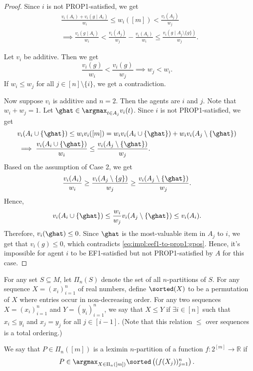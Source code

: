 \begin{proof}
Since $i$ is not PROP1-satisfied, we get
\begin{align*}
& \frac{v_i(A_i) + v_i(g \mid A_i)}{w_i} \le w_i([m]) < \frac{v_i(A_j)}{w_j}
\\ &\implies \frac{v_i(g \mid A_i)}{w_i} < \frac{v_i(A_j)}{w_j} - \frac{v_i(A_i)}{w_i}
    \le \frac{v_i(g \mid A_j \setminus \{g\})}{w_j}.
\end{align*}

Let $v_i$ be additive. Then we get
\[ \frac{v_i(g)}{w_i} < \frac{v_i(g)}{w_j} \implies w_j < w_i. \]
If $w_i \le w_j$ for all $j \in [n] \setminus \{i\}$, we get a contradiction.

Now suppose $v_i$ is additive and $n=2$.
Then the agents are $i$ and $j$. Note that $w_i + w_j = 1$.
Let $\ghat \in \argmax_{t \in A_j} v_i(t)$.
Since $i$ is not PROP1-satisfied, we get
\begin{align*}
& v_i(A_i \cup \{\ghat\}) \le w_iv_i([m]) = w_iv_i(A_i \cup \{\ghat\}) + w_iv_i(A_j \setminus \{\ghat\})
\\ &\implies \frac{v_i(A_i \cup \{\ghat\})}{w_i} \le \frac{v_i(A_j \setminus \{\ghat\})}{w_j}.
\end{align*}
Based on the assumption of Case 2, we get
\[ \frac{v_i(A_i)}{w_i} \ge \frac{v_i(A_j \setminus \{g\})}{w_j} \ge \frac{v_i(A_j \setminus \{\ghat\})}{w_j}. \]
Hence,
\[ v_i(A_i \cup \{\ghat\}) \le \frac{w_i}{w_j}v_i(A_j \setminus \{\ghat\}) \le v_i(A_i). \]
Therefore, $v_i(\ghat) \le 0$.
Since $\ghat$ is the most-valuable item in $A_j$ to $i$, we get that $v_i(g) \le 0$,
which contradicts \eqref{eq:impl:eef1-to-prop1:gpos}.
Hence, it's impossible for agent $i$ to be EF1-satisfied but not PROP1-satisfied by $A$ for this case.
\end{proof}

\begin{definition}
\label{defn:leximin}
For any set $S \subseteq M$, let $\Pi_n(S)$ denote the set of all $n$-partitions of $S$.
For any sequence $X = (x_i)_{i=1}^n$ of real numbers, define $\sorted(X)$ to be a permutation of $X$
where entries occur in non-decreasing order.
For any two sequences $X = (x_i)_{i=1}^n$ and $Y = (y_i)_{i=1}^n$, we say that $X \le Y$ if
$\exists i \in [n]$ such that $x_i \le y_i$ and $x_j = y_j$ for all $j \in [i-1]$.
(Note that this relation $\le$ over sequences is a total ordering.)

We say that $P \in \Pi_n([m])$ is a leximin $n$-partition of a function $f: 2^{[m]} \to \mathbb{R}$ if
\[ P \in \argmax_{X \in \Pi_n([m])} \sorted\left((f(X_j))_{j=1}^n\right). \]
\end{definition}

